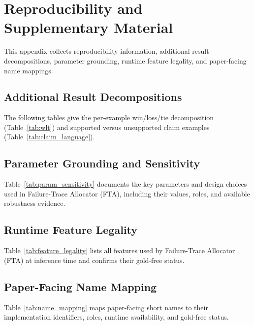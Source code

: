\appendix
\section{Reproducibility and Supplementary Material}
\label{sec:appendix_repro}
This appendix collects reproducibility information, additional result decompositions,
parameter grounding, runtime feature legality, and paper-facing name mappings.



\clearpage
\subsection*{Additional Result Decompositions}

The following tables give the per-example win/loss/tie decomposition
(Table~\ref{tab:wlt}) and supported versus unsupported claim examples
(Table~\ref{tab:claim_language}).




\clearpage
\subsection*{Parameter Grounding and Sensitivity}

Table~\ref{tab:param_sensitivity} documents the key parameters and design choices
used in Failure-Trace Allocator (FTA), including their values, roles, and available robustness evidence.



\clearpage
\subsection*{Runtime Feature Legality}

Table~\ref{tab:feature_legality} lists all features used by Failure-Trace Allocator (FTA) at
inference time and confirms their gold-free status.



\clearpage
\subsection*{Paper-Facing Name Mapping}

Table~\ref{tab:name_mapping} maps paper-facing short names to their
implementation identifiers, roles, runtime availability, and gold-free status.



